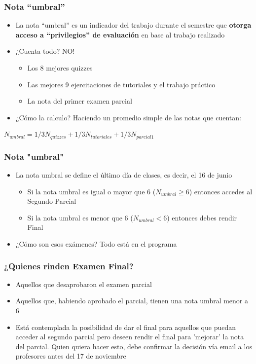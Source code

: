 \documentclass{beamer}
\begin{document}
\begin{frame}
\frametitle{Nota ``umbral''}
\begin{itemize}
    \item La nota ``umbral'' es un indicador del trabajo durante el semestre que \textbf{otorga acceso a ``privilegios'' de evaluación} en base al trabajo realizado
    \item ¿Cuenta todo? NO!
        \begin{itemize}
            \item Los 8 mejores quizzes
            \item Las mejores 9 ejercitaciones de tutoriales y el trabajo práctico
            \item La nota del primer examen parcial
        \end{itemize}
    \item ¿Cómo la calculo? Haciendo un promedio simple de las notas que cuentan:
    \end{itemize}
    
\begin{center}
 $N_{umbral}=1/3N_{quizzes}+1/3N_{tutoriales}+1/3N_{parcial 1}$   
 
\end{center}    
\end{frame}

\begin{frame}
\frametitle{Nota "umbral"}
\begin{itemize}
    \item La nota umbral se define el último día de clases, es decir, el 16 de junio      
    \begin{itemize}
            \item Si la nota umbral es igual o mayor que 6 ($N_{umbral} \geq 6$) entonces accedes al Segundo Parcial
            \item Si la nota umbral es menor que 6 ($N_{umbral} < 6$) entonces debes rendir Final       
            \end{itemize}
    \item ¿Cómo son esos exámenes? Todo está en el programa
            \end{itemize}
\end{frame}

\begin{frame}
\frametitle{¿Quienes rinden Examen Final?}
\begin{itemize}
    \item Aquellos que desaprobaron el examen parcial
    \item Aquellos que, habiendo aprobado el parcial, tienen una nota umbral menor a 6
    \item Está contemplada la posibilidad de dar el final para aquellos que puedan acceder al segundo parcial pero deseen rendir el final para 'mejorar' la nota del parcial. Quien quiera hacer esto, debe confirmar la decisión vía email a los profesores antes del 17 de noviembre
\end{itemize}
\end{frame}
\end{document}
